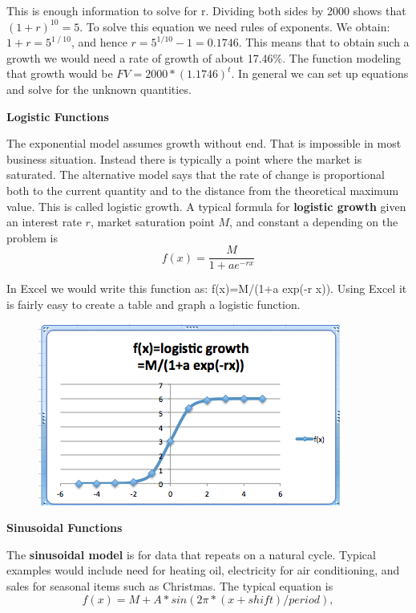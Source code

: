 \documentclass[10pt,]{book}
\newcommand{\terminology}[1]{\textbf{#1}}
\theoremstyle{plain}
\theoremstyle{definition}
\theoremstyle{definition}
\begin{document}
This is enough information to solve for r. Dividing both sides by 2000 shows that \((1+r)^{10}=5\). To solve this equation we need rules of exponents. We obtain: 
\(1+r=5^{1⁄10}\), and hence \(r= 5^{1/10}-1= 0.1746\). This means that to obtain such a growth we would need a rate of growth of about 17.46\%. The function modeling that growth would be \(FV=2000*(1.1746)^t\).
In general we can set up equations and solve for the unknown quantities. 
%
\par
\terminology{Logistic Functions}%
\par

The exponential model assumes growth without end.  That is impossible in most business situation.  Instead there is typically a point where the market is saturated.  The alternative model says that the rate of change is proportional both to the current quantity and to the distance from the theoretical maximum value.  This is called logistic growth.  A typical formula for \terminology{logistic growth} given an interest rate \(r\), market saturation point \(M\), and constant a depending on the problem is%
\begin{equation*}f(x)=  \frac{M}{1+a e^{-rx}} \end{equation*}\par
In Excel we would write this function as: f(x)=M/(1+a exp(-r x)). Using Excel it is fairly easy to create a table and graph a logistic function.%
\leavevmode%
\begin{figure}
\centering
\includegraphics[width=0.5\linewidth]{images/sec1-2-LogisticFunction.png}
\end{figure}
\par
\terminology{Sinusoidal Functions}%
\par
The \terminology{sinusoidal model} is for data that repeats on a natural cycle.  Typical examples would include need for heating oil, electricity for air conditioning, and sales for seasonal items such as Christmas.  The typical equation is
%
\begin{equation*}f(x)=M+A*sin(2\pi*(x+shift)/period),\end{equation*}\par
\end{document}
